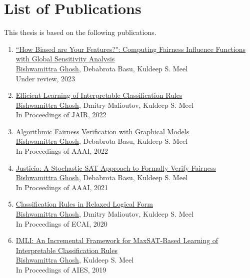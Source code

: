 
\clearpage
\section*{List of Publications}
This thesis is based on the following publications.

\begin{enumerate}
	
	\item \href{https://arxiv.org/pdf/2206.00667.pdf}{``How Biased are Your Features?": Computing Fairness Influence Functions with Global Sensitivity Analysis}\\
	\underline{Bishwamittra Ghosh}, Debabrota Basu, Kuldeep S. Meel\\
	Under review, 2023
	
	\item \href{https://arxiv.org/pdf/2205.06936.pdf}{Efficient Learning of Interpretable Classification Rules} \\
	\underline{Bishwamittra Ghosh}, Dmitry Malioutov, Kuldeep S. Meel\\
	In Proceedings of JAIR, 2022
	
	\item \href{https://arxiv.org/pdf/2109.09447.pdf}{Algorithmic Fairness Verification with Graphical Models} \\
	\underline{Bishwamittra Ghosh}, Debabrota Basu, Kuldeep S. Meel\\
	In Proceedings of AAAI, 2022
		
	\item \href{https://arxiv.org/pdf/2009.06516.pdf}{Justicia: A Stochastic SAT Approach to Formally Verify Fairness} \\
	\underline{Bishwamittra Ghosh}, Debabrota Basu, Kuldeep S. Meel\\
	In Proceedings of AAAI, 2021
	
	
	\item \href{https://bishwamittra.github.io/publication/ecai_2020/paper.pdf}{Classification Rules in Relaxed Logical Form
	} \\
	\underline{Bishwamittra Ghosh}, Dmitry Malioutov, Kuldeep S. Meel\\
	In Proceedings of ECAI, 2020
	
	\item \href{https://bishwamittra.github.io/publication/imli-ghosh.pdf}{IMLI: An Incremental Framework for MaxSAT-Based Learning of Interpretable Classification Rules}\\
	\underline{Bishwamittra Ghosh}, Kuldeep S. Meel\\
	In Proceedings of AIES, 2019
	
	
\end{enumerate}
\clearpage
